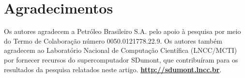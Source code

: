 \documentclass[12pt]{article}
\begin{document}
\section*{Agradecimentos}
Os autores agradecem a Petróleo Brasileiro S.A. pelo apoio à pesquisa por meio do Termo de Colaboração número 0050.0121778.22.9. Os autores também agradecem ao Laboratório Nacional de Computação Científica (LNCC/MCTI) por fornecer recursos do supercomputador SDumont, que contribuíram para os resultados da pesquisa relatados neste artigo. \textbf{\url{http://sdumont.lncc.br}}.



\end{document}
